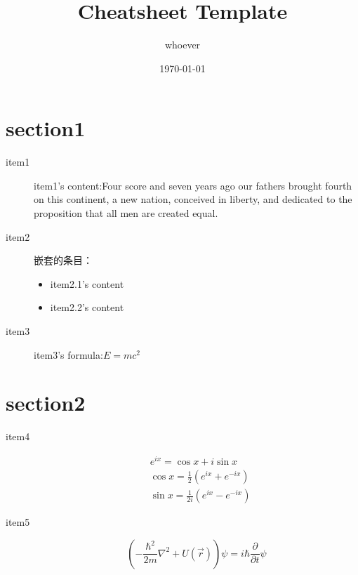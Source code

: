 \documentclass[red, cn, 8pt, cheatsheet]{elegantnote}
\title{Cheatsheet Template}
\author{whoever}
\date{\today}
\begin{document}
\begin{multicols*}{4}       %
\section{section1}          %
\begin{description}
    \item[item1]{item1's content:Four score and seven years ago our fathers brought fourth on this continent, a new nation, conceived in liberty, and dedicated to the proposition that all men are created equal.}       %
    \item[item2]                        %
    嵌套的条目：
        \begin{itemize}
            \item item2.1's content
            \item item2.2's content
        \end{itemize}
    \item[item3]{item3's formula:$E=mc^2$}  %

\end{description}

\section{section2}
\begin{description}
    \item[item4]
    \begin{equation*}           %
        \begin{aligned}
            &e^{ix} = \cos x + i\sin x\\
            &\cos x = \frac{1}{2}(e^{ix}+e^{-ix})\\
            &\sin x = \frac{1}{2i}(e^{ix}-e^{-ix})
        \end{aligned}
    \end{equation*}
    \item[item5]
    \begin{equation*}
        \left(-\frac{\hbar^2}{2m}\nabla^2+U(\vec r)\right)\psi = i\hbar\frac{\partial}{\partial t}\psi
    \end{equation*}

\end{description}



\end{multicols*}
\end{document}
